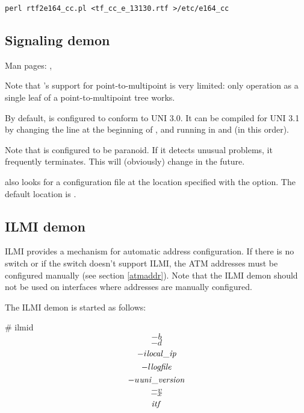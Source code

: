 \begin{verbatim}
perl rtf2e164_cc.pl <tf_cc_e_13130.rtf >/etc/e164_cc
\end{verbatim}


\subsection{Signaling demon}

Man pages: , 

Note that 's support for point-to-multipoint is very limited:
only operation as a single leaf of a point-to-multipoint tree works.

By default,  is configured to conform to UNI 3.0. It can be
compiled for UNI 3.1 by changing the  line at the beginning
of , and running  in
 and  (in this order).

Note that  is configured to be paranoid. If it detects unusual
problems, it frequently terminates. This will (obviously) change in the
future.

 also looks for a configuration file at the location specified
with the  option. The default location is .


\subsection{ILMI demon}

ILMI provides a mechanism for automatic address configuration. If there is
no switch or if the switch doesn't support ILMI, the ATM addresses must
be configured manually (see section \ref{atmaddr}). Note that the ILMI
demon should not be used on interfaces where addresses are manually
configured.

The ILMI demon is started as follows:

\begin{command}
\# ilmid \[-b\] \[-d\] \[-i {\it local\_ip\/}\] \[-l {\it logfile\/}\]
  \[-u {\it uni\_version\/}\] \[-v\] \[-x\] \[{\it itf\/}\]
\end{command}

